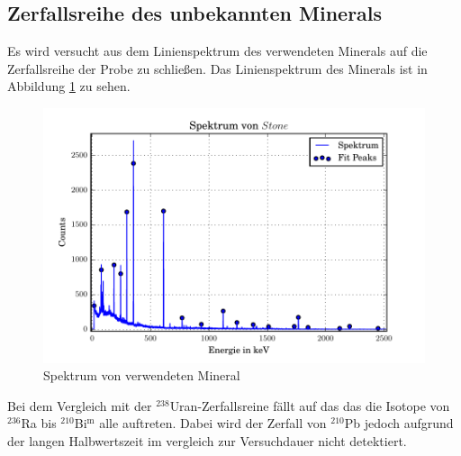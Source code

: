 \subsection{Zerfallsreihe des unbekannten Minerals}
Es wird versucht aus dem Linienspektrum des verwendeten Minerals auf die Zerfallsreihe der Probe zu schließen. Das Linienspektrum des Minerals ist in Abbildung \ref{fig:Stone} zu sehen.
\begin{figure}[htpb]
  \centering
  \includegraphics[width=\textwidth]{./build/SpektSt.pdf}
  \caption{Spektrum von verwendeten Mineral}
  \label{fig:Stone}
\end{figure}
Bei dem Vergleich mit der $^{238}$Uran-Zerfallsreine fällt auf das das die Isotope von $^{236}$Ra bis $^{210}$Bi$^\text{m}$ alle auftreten. Dabei wird der Zerfall von $^{210}$Pb jedoch aufgrund der langen Halbwertszeit im vergleich zur Versuchdauer nicht detektiert.  
